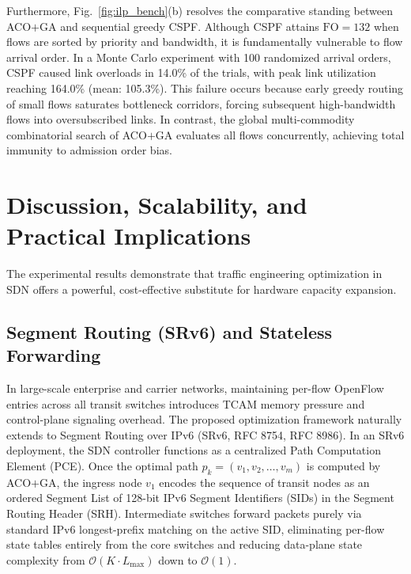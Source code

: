 \documentclass[journal]{IEEEtran}
\newcommand{\FO}{\mathrm{FO}}
\begin{document}
Furthermore, Fig.~\ref{fig:ilp_bench}(b) resolves the comparative standing between ACO$+$GA and sequential greedy CSPF. Although CSPF attains $\FO = 132$ when flows are sorted by priority and bandwidth, it is fundamentally vulnerable to flow arrival order. In a Monte Carlo experiment with 100 randomized arrival orders, CSPF caused link overloads in 14.0\% of the trials, with peak link utilization reaching 164.0\% (mean: 105.3\%). This failure occurs because early greedy routing of small flows saturates bottleneck corridors, forcing subsequent high-bandwidth flows into oversubscribed links. In contrast, the global multi-commodity combinatorial search of ACO$+$GA evaluates all flows concurrently, achieving total immunity to admission order bias.

\section{Discussion, Scalability, and Practical Implications}
\label{sec:discussion}
The experimental results demonstrate that traffic engineering optimization in SDN offers a powerful, cost-effective substitute for hardware capacity expansion.

\subsection{Segment Routing (SRv6) and Stateless Forwarding}
In large-scale enterprise and carrier networks, maintaining per-flow OpenFlow entries across all transit switches introduces TCAM memory pressure and control-plane signaling overhead. The proposed optimization framework naturally extends to Segment Routing over IPv6 (SRv6, RFC 8754, RFC 8986). In an SRv6 deployment, the SDN controller functions as a centralized Path Computation Element (PCE). Once the optimal path $p_k = (v_1, v_2, \dots, v_m)$ is computed by ACO$+$GA, the ingress node $v_1$ encodes the sequence of transit nodes as an ordered Segment List of 128-bit IPv6 Segment Identifiers (SIDs) in the Segment Routing Header (SRH). Intermediate switches forward packets purely via standard IPv6 longest-prefix matching on the active SID, eliminating per-flow state tables entirely from the core switches and reducing data-plane state complexity from $\mathcal{O}(K \cdot L_{\max})$ down to $\mathcal{O}(1)$.
\end{document}
